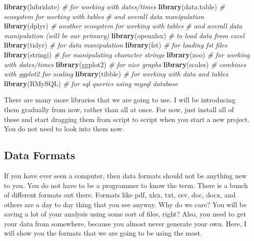 \documentclass[]{book}
\newenvironment{Shaded}{\begin{snugshade}}{\end{snugshade}}
\newcommand{\CommentTok}[1]{\textcolor[rgb]{0.56,0.35,0.01}{\textit{#1}}}
\newcommand{\KeywordTok}[1]{\textcolor[rgb]{0.13,0.29,0.53}{\textbf{#1}}}
\newcommand{\NormalTok}[1]{#1}
\begin{document}
\begin{Shaded}
\begin{Highlighting}[]
  \KeywordTok{library}\NormalTok{(lubridate) }\CommentTok{# for working with dates/times}
  \KeywordTok{library}\NormalTok{(data.table) }\CommentTok{# ecosystem for working with tables}
\CommentTok{# and averall data manipulation}
  \KeywordTok{library}\NormalTok{(dplyr) }\CommentTok{# another ecosystem for working with tables}
\CommentTok{# and averall data manipulation (will be our primary)}
  \KeywordTok{library}\NormalTok{(openxlsx) }\CommentTok{# to load data from excel}
  \KeywordTok{library}\NormalTok{(tidyr) }\CommentTok{# for data manipulation}
  \KeywordTok{library}\NormalTok{(fst) }\CommentTok{# for loading fst files }
  \KeywordTok{library}\NormalTok{(stringi) }\CommentTok{# for manipulating character strings}
  \KeywordTok{library}\NormalTok{(zoo) }\CommentTok{# for working with dates/times}
  \KeywordTok{library}\NormalTok{(ggplot2) }\CommentTok{# for nice graphs}
  \KeywordTok{library}\NormalTok{(scales) }\CommentTok{# combines with ggplot2 for scaling}
  \KeywordTok{library}\NormalTok{(tibble) }\CommentTok{# for working with data and tables}
  \KeywordTok{library}\NormalTok{(RMySQL) }\CommentTok{# for sql queries using mysql database}
\end{Highlighting}
\end{Shaded}

There are many more libraries that we are going to use. I will be introducing them gradually from now, rather than all at once. For now, just install all of these and start dragging them from script to script when you start a new project. You do not need to look into them now.

\hypertarget{data-formats}{%
\subsection{Data Formats}\label{data-formats}}

If you have ever seen a computer, then data formats should not be anything new to you. You do not have to be a programmer to know the term. There is a bunch of different formats out there. Formats like pdf, xlsx, txt, csv, doc, docx, and others are a day to day thing that you see anyway. Why do we care? You will be saving a lot of your analysis using some sort of files, right? Also, you need to get your data from somewhere, because you almost never generate your own. Here, I will show you the formats that we are going to be using the most.
\end{document}
